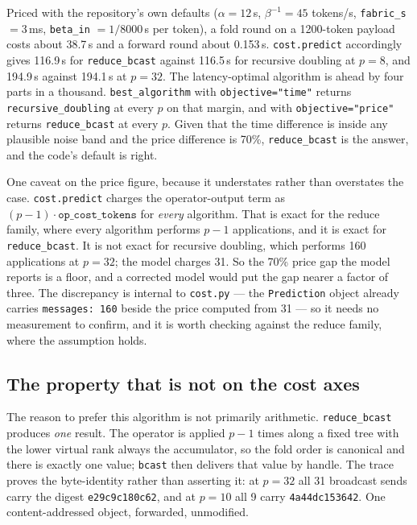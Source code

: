 \documentclass[11pt]{article}
\begin{document}
Priced with the repository's own defaults ($\alpha = 12$\,s, $\beta^{-1} = 45$ tokens/s,
\texttt{fabric\_s} $= 3$\,ms, \texttt{beta\_in} $= 1/8000$\,s per token), a fold round on a
1200-token payload costs about 38.7\,s and a forward round about 0.153\,s.
\texttt{cost.predict} accordingly gives 116.9\,s for \texttt{reduce\_bcast} against 116.5\,s for
recursive doubling at $p=8$, and 194.9\,s against 194.1\,s at $p=32$. The latency-optimal
algorithm is ahead by four parts in a thousand. \texttt{best\_algorithm} with
\texttt{objective="time"} returns \texttt{recursive\_doubling} at every $p$ on that margin, and
with \texttt{objective="price"} returns \texttt{reduce\_bcast} at every $p$. Given that the time
difference is inside any plausible noise band and the price difference is 70\%,
\texttt{reduce\_bcast} is the answer, and the code's default is right.

One caveat on the price figure, because it understates rather than overstates the case.
\texttt{cost.predict} charges the operator-output term as $(p-1) \cdot \texttt{op\_cost\_tokens}$
for \emph{every} algorithm. That is exact for the reduce family, where every algorithm performs
$p-1$ applications, and it is exact for \texttt{reduce\_bcast}. It is not exact for recursive
doubling, which performs 160 applications at $p=32$; the model charges 31. So the 70\% price gap
the model reports is a floor, and a corrected model would put the gap nearer a factor of three.
The discrepancy is internal to \texttt{cost.py} --- the \texttt{Prediction} object already carries
\texttt{messages: 160} beside the price computed from 31 --- so it needs no measurement to
confirm, and it is worth checking against the reduce family, where the assumption holds.

\subsection{The property that is not on the cost axes}

The reason to prefer this algorithm is not primarily arithmetic. \texttt{reduce\_bcast} produces
\emph{one} result. The operator is applied $p-1$ times along a fixed tree with the lower virtual
rank always the accumulator, so the fold order is canonical and there is exactly one value;
\texttt{bcast} then delivers that value by handle. The trace proves the byte-identity rather than
asserting it: at $p=32$ all 31 broadcast sends carry the digest \texttt{e29c9c180c62}, and at
$p=10$ all 9 carry \texttt{4a44dc153642}. One content-addressed object, forwarded, unmodified.
\end{document}
